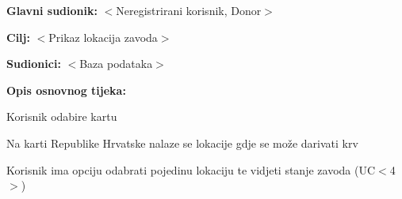 					\noindent {}
					\begin{packed_item}
						
						\item \textbf{Glavni sudionik:} $<$Neregistrirani korisnik, Donor$>$
						\item \textbf{Cilj:} $<$Prikaz lokacija zavoda$>$
						\item \textbf{Sudionici:} $<$Baza podataka$>$
						\item \textbf{Opis osnovnog tijeka:}
						
						\begin{packed_enum}
							
							\item Korisnik odabire kartu
							\item Na karti Republike Hrvatske nalaze se lokacije gdje se može darivati krv
							\item Korisnik ima opciju odabrati pojedinu lokaciju te vidjeti stanje zavoda (UC$<$4$>$)
							
						\end{packed_enum}
						
					\end{packed_item}
					
